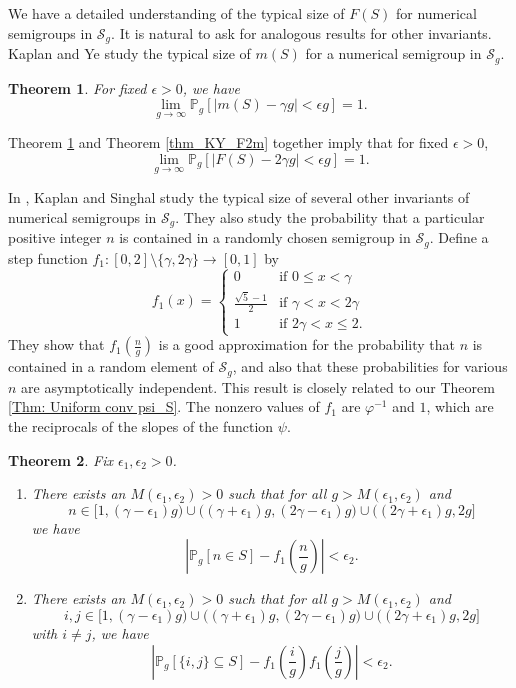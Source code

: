 \documentclass[12pt]{amsart}
\renewcommand{\phi}{\varphi}
\renewcommand{\P}{\mathbb{P}}
\def\SS{{\mathcal S}}
\newtheorem{theorem}{Theorem}
\begin{document}
We have a detailed understanding of the typical size of $F(S)$ for numerical semigroups in $\SS_g$. It is natural to ask for analogous results for other invariants.  
Kaplan and Ye study the typical size of $m(S)$ for a numerical semigroup in $\SS_g$.
\begin{theorem}\cite[Proposition 16]{kaplan2013proportion}\label{Kaplan Mult}
For fixed $\epsilon > 0$, we have
\[
\lim_{g\to\infty}\P_{g}[|m(S)-\gamma g |< \epsilon g]=1.
\]
\end{theorem}
Theorem \ref{Kaplan Mult} and Theorem \ref{thm_KY_F2m} together imply that for fixed $\epsilon>0$,
\begin{equation}\label{eqn:FG}
    \lim_{g\to\infty}\P_{g}[|F(S)-2\gamma g |< \epsilon g]=1.
\end{equation}

In \cite{kaplan2023expected}, Kaplan and Singhal study the typical size of several other invariants of numerical semigroups in $\SS_g$.  They also study the probability that a particular positive integer $n$ is contained in a randomly chosen semigroup in $\SS_g$.  Define a step function $f_1:[0,2]\setminus\{\gamma,2\gamma\}\to [0,1]$ by
\[
f_1(x) = 
\begin{cases}
    0  & \mbox{if } 0 \leq x <\gamma \\
    \frac{\sqrt{5}-1}{2}  & \mbox{if } \gamma< x<2\gamma \\
    1 & \mbox{if } 2\gamma<x\leq 2.
\end{cases}
\]
They show that $f_1\left(\frac{n}{g}\right)$ is a good approximation for the probability that $n$ is contained in a random element of $\SS_g$, and also that these probabilities for various $n$ are asymptotically independent.  This result is closely related to our Theorem \ref{Thm: Uniform conv psi_S}. The nonzero values of $f_1$ are $\phi^{-1}$ and $1$, which are the reciprocals of the slopes of the function $\psi$.
\begin{theorem}\cite[Theorem 26]{kaplan2023expected}
Fix $\epsilon_1, \epsilon_2 > 0$.
\begin{enumerate}
\item There exists an $M(\epsilon_1, \epsilon_2)>0$ such that for all $g>M(\epsilon_1, \epsilon_2)$ and
\[
n \in \big[1,(\gamma-\epsilon_1)g\big) \cup \big((\gamma+\epsilon_1)g,(2\gamma-\epsilon_1)g\big) \cup \big((2\gamma+\epsilon_1)g,2g\big]
\]
we have
\[
\left|\P_g[n \in S]-f_{1}\left(\frac{n}{g}\right)\right|<\epsilon_2.
\]

\item There exists an $M(\epsilon_1, \epsilon_2)>0$ such that for all $g>M(\epsilon_1, \epsilon_2)$ and
\[
i,j \in \big[1,(\gamma-\epsilon_1)g\big) \cup \big((\gamma+\epsilon_1)g,(2\gamma-\epsilon_1)g\big) \cup \big((2\gamma+\epsilon_1)g,2g\big]
\]
with $i\neq j$, we have
\[
\left|\P_g[\{i,j\}\subseteq S]-f_{1}\left(\frac{i}{g}\right)f_{1}\left(\frac{j}{g}\right)\right|<\epsilon_2.
\]
\end{enumerate}
\end{theorem}
\end{document}
